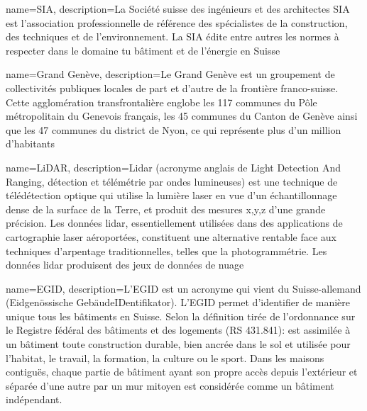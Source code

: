 
{
    name=SIA,
    description={La Société suisse des ingénieurs et des architectes SIA \cite{sia_sia_nodate} est l’association professionnelle de référence des spécialistes de la construction, des techniques et de l’environnement. La SIA édite entre autres les normes à respecter dans le domaine tu bâtiment et de l'énergie en Suisse}
}

{
    name=Grand Genève,
    description={Le Grand Genève \cite{noauthor_grand_nodate} est un groupement de collectivités publiques locales de part et d’autre de la frontière franco-suisse. Cette agglomération transfrontalière englobe les 117 communes du Pôle métropolitain du Genevois français, les 45 communes du Canton de Genève ainsi que les 47 communes du district de Nyon, ce qui représente plus d’un million d’habitants}
}

{
    name=LiDAR,
    description={Lidar \cite{esri_quoi_2025} (acronyme anglais de Light Detection And Ranging, détection et télémétrie par ondes lumineuses) est une technique de télédétection optique qui utilise la lumière laser en vue d'un échantillonnage dense de la surface de la Terre, et produit des mesures x,y,z d'une grande précision. Les données lidar, essentiellement utilisées dans des applications de cartographie laser aéroportées, constituent une alternative rentable face aux techniques d’arpentage traditionnelles, telles que la photogrammétrie. Les données lidar produisent des jeux de données de nuage}
}

{
    name=EGID,
    description={L'EGID \cite{office_federal_de_la_statistique_egidewid_nodate} est un acronyme qui vient du Suisse-allemand (Eidgenössische GebäudeIDentifikator). L'EGID permet d'identifier de manière unique tous les bâtiments en Suisse. Selon la définition tirée de l’ordonnance sur le Registre fédéral des bâtiments et des logements (RS 431.841): est assimilée à un bâtiment toute construction durable, bien ancrée dans le sol et utilisée pour l’habitat, le travail, la formation, la culture ou le sport. Dans les maisons contiguës, chaque partie de bâtiment ayant son propre accès depuis l’extérieur et séparée d’une autre par un mur mitoyen est considérée comme un bâtiment indépendant.\cite{office_federal_de_la_statistique_egidewid_nodate}}
}




